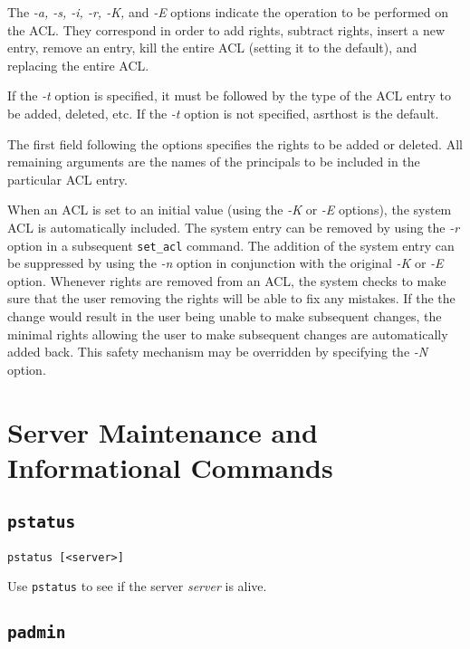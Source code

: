 The {\em -a, -s, -i, -r, -K,} and {\em -E} options indicate the
operation to be performed on the ACL.  They correspond in order to add
rights, subtract rights, insert a new entry, remove an entry, kill the
entire ACL (setting it to the default), and replacing the entire ACL.

If the {\em -t} option is specified, it must be followed by the type
of the ACL entry to be added, deleted, etc.  If the {\em -t} option is
not specified, {\sc asrthost} is the default.

The first field following the options specifies the rights to be added
or deleted.  All remaining arguments are the names of the principals
to be included in the particular ACL entry.

When an ACL is set to an initial value (using the {\em -K} or {\em -E}
options), the {\sc system} ACL is automatically included.  The {\sc
system} entry can be removed by using the {\em -r} option in a
subsequent {\tt set\_acl} command.  The addition of the {\sc system}
entry can be suppressed by using the {\em -n} option in conjunction
with the original {\em -K} or {\em -E} option.  Whenever rights are
removed from an ACL, the system checks to make sure that the user
removing the rights will be able to fix any mistakes.  If the the
change would result in the user being unable to make subsequent
changes, the minimal rights allowing the user to make subsequent
changes are automatically added back.  This safety mechanism may be
overridden by specifying the {\em -N} option.



\section{Server Maintenance and Informational Commands}

\subsection{\tt pstatus}

\begin{verbatim}
pstatus [<server>]
\end{verbatim}

Use {\tt pstatus} to see if the server {\em server} is alive.

\subsection{{\tt padmin}}

